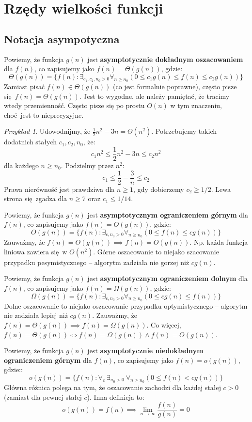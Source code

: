 \documentclass[10pt, oneside]{article}
\theoremstyle{remark}
\newtheorem*{example}{Przykład}
\begin{document}
\section{Rzędy wielkości funkcji}

\subsection{Notacja asympotyczna}

Powiemy, że funkcja $g(n)$ jest \textbf{asymptotycznie dokładnym oszacowaniem} dla $f(n)$, co zapisujemy jako $f(n)=\Theta(g(n))$, gdzie:
$$
\Theta(g(n)) = \{ f(n): \exists_{c_1, c_2, n_0>0} \forall_{n \geq n_0} \left( 0 \leq c_1 g(n) \leq f(n) \leq c_2 g(n) \right) \}
$$
Zamiast pisać $f(n) \in \Theta(g(n))$ (co jest formalnie poprawne), często pisze się $f(n) = \Theta(g(n))$.
Jest to wygodne, ale należy pamiętać, że tracimy wtedy przemienność.
Często pisze się po prostu $O(n)$ w tym znaczeniu, choć jest to nieprecyzyjne.
\begin{example}
	Udowodnijmy, że $\frac{1}{2}n^2 - 3n = \Theta(n^2)$.
	Potrzebujemy takich dodatnich stałych $c_1, c_2, n_0$, że:
	$$
	c_1 n^2 \leq \frac{1}{2}n^2 - 3n \leq c_2 n^2
	$$
	dla każdego $n \geq n_0$.
	Podzielmy przez $n^2$:
	$$
	c_1 \leq \frac{1}{2} - \frac{3}{n} \leq c_2
	$$
	Prawa nierówność jest prawdziwa dla $n \geq 1$, gdy dobierzemy $c_2 \geq 1/2$.
	Lewa strona się zgadza dla $n \geq 7$ oraz $c_1 \leq 1/14$.
\end{example}

Powiemy, że funkcja $g(n)$ jest \textbf{asymptotycznym ograniczeniem górnym} dla $f(n)$, co zapisujemy jako $f(n)=O(g(n))$, gdzie:
$$
O(g(n)) = \{ f(n): \exists_{c, n_0>0} \forall_{n \geq n_0} \left(0 \leq f(n) \leq c g(n) \right) \}
$$
Zauważmy, że $f(n)=\Theta (g(n)) \implies f(n)=O(g(n))$.
Np. każda funkcja liniowa zawiera się w $O(n^2)$.
Górne oszacowanie to niejako szacowanie przypadku pesymistycznego -- algorytm zadziała nie gorzej niż $cg(n)$.

Powiemy, że funkcja $g(n)$ jest \textbf{asymptotycznym ograniczeniem dolnym} dla $f(n)$, co zapisujemy jako $f(n)=\Omega(g(n))$, gdzie:
$$
\Omega(g(n)) = \{ f(n): \exists_{c, n_0>0} \forall_{n \geq n_0} \left(0 \leq c g(n) \leq f(n) \right) \}
$$
Dolne oszacowanie to niejako oszacowanie przypadku optymistycznego -- algorytm nie zadziała lepiej niż $cg(n)$.
Zauważmy, że $f(n)=\Theta (g(n)) \implies f(n)=\Omega(g(n))$.
Co więcej, $f(n)=\Theta (g(n)) \iff f(n)=\Omega(g(n)) \land f(n)=O(g(n))$.

Powiemy, że funkcja $g(n)$ jest \textbf{asymptotycznie niedokładnym ograniczeniem górnym} dla $f(n)$, co zapisujemy jako $f(n)=o(g(n))$, gdzie::
$$
o(g(n)) = \{ f(n): \forall_{c}\ \exists_{n_0>0}\ \forall_{n \geq n_0} \left(0 \leq f(n) < c g(n) \right) \}
$$
Główna różnica polega na tym, że oszacowanie zachodzi dla każdej stałej $c>0$ (zamiast dla pewnej stałej $c$).
Inna definicja to:
$$
o(g(n)) = f(n) \implies \lim_{n \to \infty} \frac{f(n)}{g(n)} = 0
$$
\end{document}
